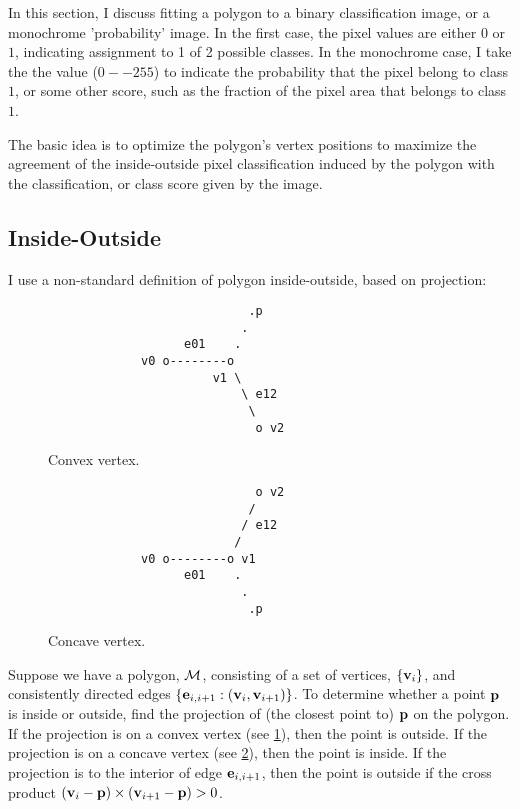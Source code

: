 \label{sec:image-fitting}

In this section, I discuss fitting a polygon to a binary classification
image, or a monochrome 'probability' image.
In the first case, the pixel values are either $0$ or $1$,
indicating assignment to 1 of 2 possible classes.
In the monochrome case, I take the the value ($0--255$) to indicate
the probability that the pixel belong to class $1$,
or some other score, such as the fraction of the pixel area that belongs
to class $1$.

The basic idea is to optimize the polygon's vertex positions
to maximize the agreement of the inside-outside pixel classification
induced by the polygon with the classification, or class score
given by the image.

\subsection{Inside-Outside}
\label{sec:inside-outside}

I use a non-standard definition of polygon inside-outside,
based on projection:

\begin{figure}[!htp]
\centering
\begin{verbatim}
                            .p
                           .
                   e01    .
             v0 o--------o
                       v1 \
                           \ e12
                            \
                             o v2
\end{verbatim}
\caption{Convex vertex.
\label{fig:convex-vertex}}
\end{figure}

\begin{figure}[!htp]
\centering
\begin{verbatim}
                             o v2
                            /
                           / e12
                          /
             v0 o--------o v1
                   e01    .
                           .
                            .p
\end{verbatim}
\caption{Concave vertex.
\label{fig:concave-vertex}}
\end{figure}

Suppose we have a polygon, ${\mathcal M}$, consisting of a set of vertices,
$\{{\mathbf v}_i\}$, and consistently directed edges $\{{\mathbf e}_{i,i+1}:({\mathbf v}_i,{\mathbf v}_{i+1})\}$.
To determine whether a point ${\mathbf p}$ is inside or outside,
find the projection of (the closest point to) ${\mathbf p}$ on the polygon.
If the projection is on a convex vertex (see \ref{fig:convex-vertex}),
then the point is outside.
If the projection is on a concave vertex (see \ref{fig:concave-vertex}),
then the point is inside.
If the projection is to the interior of edge ${\mathbf e}_{i,i+1}$,
then the point is outside if the cross product
$({\mathbf v}_i-{\mathbf p}) \times ({\mathbf v}_{i+1}-{\mathbf p}) > 0$.


